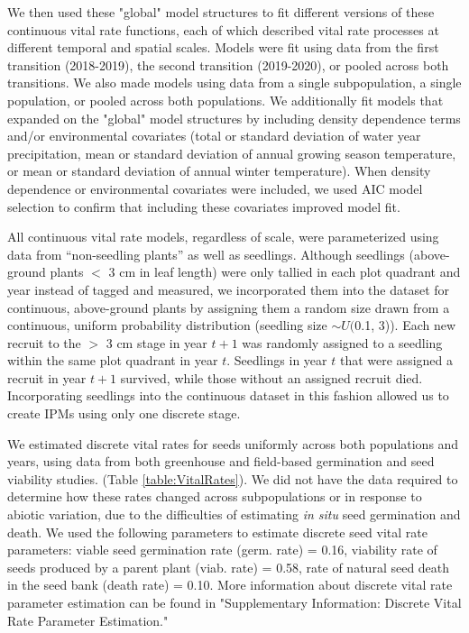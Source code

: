 \documentclass[12pt, letterpaper]{article}
\begin{document}
We then used these "global" model structures to fit different versions of these continuous vital rate functions, each of which described vital rate processes at different temporal and spatial scales. Models were fit using data from the first transition (2018-2019), the second transition (2019-2020), or pooled across both transitions. We also made models using data from a single subpopulation, a single population, or pooled across both populations. We additionally fit models that expanded on the "global" model structures by including density dependence terms and/or environmental covariates (total or standard deviation of water year precipitation, mean or standard deviation of annual growing season temperature, or mean or standard deviation of annual winter temperature). When density dependence or environmental covariates were included, we used AIC model selection to confirm that including these covariates improved model fit.   

All continuous vital rate models, regardless of scale, were parameterized using data from “non-seedling plants” as well as seedlings. Although seedlings (above-ground plants $<$ 3 cm in leaf length) were only tallied in each plot quadrant and year instead of tagged and measured, we incorporated them into the dataset for continuous, above-ground plants by assigning them a random size drawn from a continuous, uniform probability distribution (seedling size $\sim U($0.1, 3)). Each new recruit to the $>$ 3 cm stage in year $t+1$ was randomly assigned to a seedling within the same plot quadrant in year $t$. Seedlings in year $t$ that were assigned a recruit in year $t+1$ survived, while those without an assigned recruit died. Incorporating seedlings into the continuous dataset in this fashion allowed us to create IPMs using only one discrete stage.

We estimated discrete vital rates for seeds uniformly across both populations and years, using data from both greenhouse and field-based germination and seed viability studies. (Table \ref{table:VitalRates}). We did not have the data required to determine how these rates changed across subpopulations or in response to abiotic variation, due to the difficulties of estimating \textit{in situ} seed germination and death. We used the following parameters to estimate discrete seed vital rate parameters: viable seed germination rate (germ. rate) = 0.16, viability rate of seeds produced by a parent plant (viab. rate) = 0.58, rate of natural seed death in the seed bank (death rate) = 0.10. More information about discrete vital rate parameter estimation can be found in "Supplementary Information: Discrete Vital Rate Parameter Estimation." 
\end{document}
